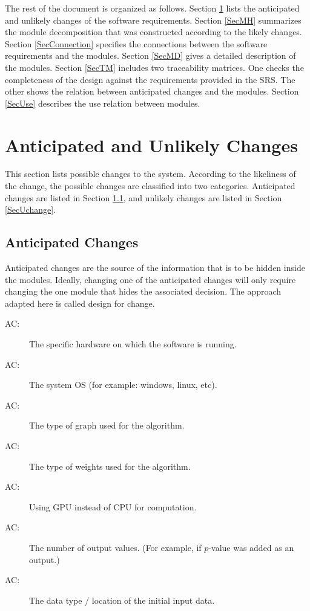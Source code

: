 \documentclass[12pt, titlepage]{article}
\newcounter{acnum}
\newcommand{\actheacnum}{AC\theacnum}
\begin{document}
The rest of the document is organized as follows. Section
\ref{SecChange} lists the anticipated and unlikely changes of the software
requirements. Section \ref{SecMH} summarizes the module decomposition that
was constructed according to the likely changes. Section \ref{SecConnection}
specifies the connections between the software requirements and the
modules. Section \ref{SecMD} gives a detailed description of the
modules. Section \ref{SecTM} includes two traceability matrices. One checks
the completeness of the design against the requirements provided in the SRS. The
other shows the relation between anticipated changes and the modules. Section
\ref{SecUse} describes the use relation between modules.

\section{Anticipated and Unlikely Changes} \label{SecChange}

This section lists possible changes to the system. According to the likeliness
of the change, the possible changes are classified into two
categories. Anticipated changes are listed in Section \ref{SecAchange}, and
unlikely changes are listed in Section \ref{SecUchange}.

\subsection{Anticipated Changes} \label{SecAchange}

Anticipated changes are the source of the information that is to be hidden
inside the modules. Ideally, changing one of the anticipated changes will only
require changing the one module that hides the associated decision. The approach
adapted here is called design for
change.

\begin{description}
\item[ \actheacnum \label{AC_hardware}:] The specific
  hardware on which the software is running.
\item[ \actheacnum \label{AC_OS}:] The system OS (for example: windows, linux, etc).
\item[ \actheacnum \label{AC_graph}:] The type of graph used for the algorithm.
\item[ \actheacnum \label{ac_weight}:] The type of weights used for the algorithm.
\item[ \actheacnum \label{AC_GPU}:] Using GPU instead of CPU for computation.
\item[ \actheacnum \label{ac_output}:] The number of output values. (For example, if $p$-value was added as an output.)
\item[ \actheacnum \label{ac_input}:] The data type / location of the initial input data.
\end{description}
\end{document}
